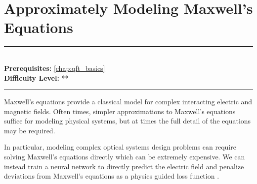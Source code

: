 \documentclass[book.tex]{subfiles}
\begin{document}
\chapter{Approximately Modeling Maxwell's Equations}

\label{chap:pinns_maxwell}
\noindent\rule{11cm}{0.4pt} \\
\textbf{Prerequisites:} \autoref{chap:qft_basics}  \\
\textbf{Difficulty Level:} ** \\
\noindent\rule{11cm}{0.4pt}
\vspace{5mm}

Maxwell's equations provide a classical model for complex interacting electric and magnetic fields. Often times, simpler approximations to Maxwell's equations suffice for modeling physical systems, but at times the full detail of the equations may be required.

In particular, modeling complex optical systems design problems can require solving Maxwell's equations directly which can be extremely expensive. We can instead train a neural network to directly predict the electric field and penalize deviations from Maxwell's equations as a physics guided loss function \cite{lim2022maxwellnet}.

\end{document}
